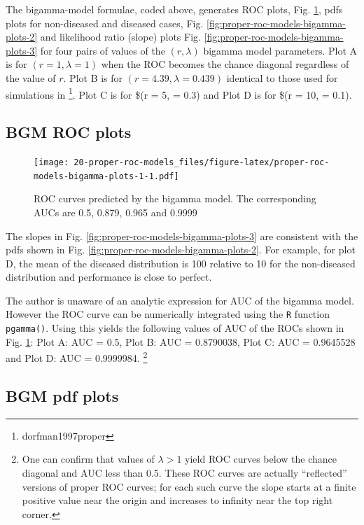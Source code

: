 \documentclass[
]{book}
\begin{document}
The bigamma-model formulae, coded above, generates ROC plots, Fig. \ref{fig:proper-roc-models-bigamma-plots-1}, pdfs plots for non-diseased and diseased cases, Fig. \ref{fig:proper-roc-models-bigamma-plots-2} and likelihood ratio (slope) plots Fig. \ref{fig:proper-roc-models-bigamma-plots-3} for four pairs of values of the \((r, \lambda)\) bigamma model parameters. Plot A is for \((r = 1, \lambda = 1)\) when the ROC becomes the chance diagonal regardless of the value of \(r\). Plot B is for \((r = 4.39, \lambda = 0.439)\) identical to those used for simulations in \footnote{dorfman1997proper}. Plot C is for \$(r = 5, \lambda = 0.3) and Plot D is for \$(r = 10, \lambda = 0.1).

\hypertarget{proper-roc-models-bigamma-rocs}{%
\subsection{BGM ROC plots}\label{proper-roc-models-bigamma-rocs}}

\begin{figure}
\centering
\texttt{[image: 20-proper-roc-models\_files/figure-latex/proper-roc-models-bigamma-plots-1-1.pdf]}
\caption{\label{fig:proper-roc-models-bigamma-plots-1}ROC curves predicted by the bigamma model. The corresponding AUCs are 0.5, 0.879, 0.965 and 0.9999}
\end{figure}

The slopes in Fig. \ref{fig:proper-roc-models-bigamma-plots-3} are consistent with the pdfs shown in Fig. \ref{fig:proper-roc-models-bigamma-plots-2}. For example, for plot D, the mean of the diseased distribution is 100 relative to 10 for the non-diseased distribution and performance is close to perfect.

The author is unaware of an analytic expression for AUC of the bigamma model. However the ROC curve can be numerically integrated using the \texttt{R} function \texttt{pgamma()}. Using this yields the following values of AUC of the ROCs shown in Fig. \ref{fig:proper-roc-models-bigamma-plots-1}: Plot A: AUC = 0.5, Plot B: AUC = 0.8790038, Plot C: AUC = 0.9645528 and Plot D: AUC = 0.9999984. \footnote{One can confirm that values of \(\lambda > 1\) yield ROC curves below the chance diagonal and AUC less than 0.5. These ROC curves are actually ``reflected'' versions of proper ROC curves; for each such curve the slope starts at a finite positive value near the origin and increases to infinity near the top right corner.}

\hypertarget{proper-roc-models-bigamma-pdfs}{%
\subsection{BGM pdf plots}\label{proper-roc-models-bigamma-pdfs}}
\end{document}
